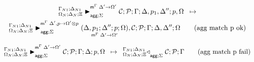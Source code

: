 
\begin{multline}
\transx{
   \matstatea{\Delta_N}{\lstack{C};
      \lstack{P}}{\Gamma}{\Delta, p_1, \Delta''}{p, \Omega}{\Delta' \rightarrow
         \Omega'}{\Sigma}
}
{
   \matstatea{\Delta_N}{\lframe{\Delta,
   p_1}{\Delta''}{p}{\Omega}{\Delta'}{\Omega'}, \lstack{C}; \lstack{P}}{\Gamma}{\Delta,
      \Delta''}{\Omega}{\Delta', p \rightarrow \Omega' \otimes
      p}{\Sigma}\tag{agg match p ok}
}
\end{multline}

\[
\trans{
   \matstatea{\Delta_N}{\lstack{C}; \lstack{P}}{\Gamma}{\Delta}{p,
      \Omega}{\Delta' \rightarrow \Omega'}{\Sigma}
}
{
   \contstatea{\Delta_N}{\lstack{C} ; \lstack{P}}{\Gamma}{\Sigma}
}\tag{agg match p fail}
\]
